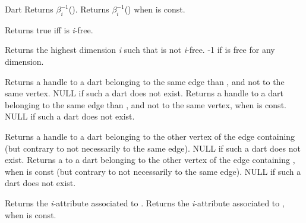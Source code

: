 \begin{ccRefConcept}{Dart}
         {Returns $\beta_i^{-1}$().
          }
\ccGlue
{}
         {Returns $\beta_i^{-1}$() when  is const.
          }

         {Returns true iff  is \emph{i}-free.
          }

         {Returns the highest dimension \emph{i} such that  is not \emph{i}-free.
          -1 if  is free for any dimension.}

         {Returns a handle to a dart belonging to the same edge 
          than , and not to the same vertex.
          NULL if such a dart does not exist.}
\ccGlue
{}
         {Returns a handle to a dart belonging to the same edge 
          than , and not to the same vertex, when  is const.
          NULL if such a dart does not exist.}

         {Returns a handle to a dart belonging to the other vertex of
          the edge containing  (but contrary to  not 
          necessarily to the same edge). NULL if such a dart does not exist.}
\ccGlue
{}
         {Returns a  to a dart belonging to the other vertex of
          the edge containing , when  is const (but contrary to
           not necessarily to the same edge). 
          NULL if such a dart does not exist.}


         {Returns the \emph{i}-attribute associated to .
           }
\ccGlue
{}
         {Returns the \emph{i}-attribute associated to ,
           when   is const.
           }


\end{ccRefConcept}
